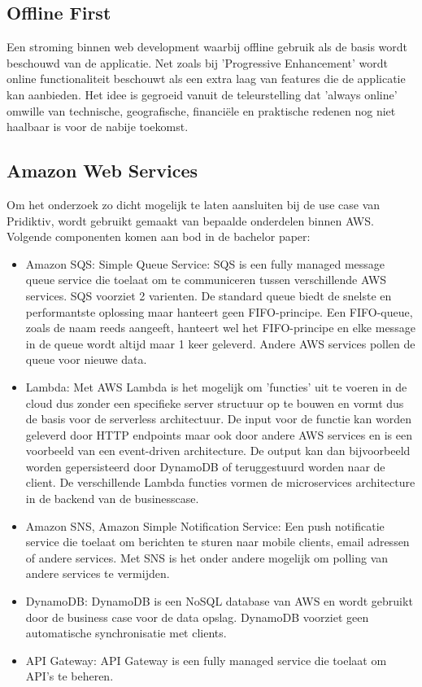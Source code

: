 \subsection{Offline First}
Een stroming \autocite{offline-first} binnen web development waarbij offline gebruik als de basis wordt beschouwd van de applicatie. Net zoals bij 'Progressive Enhancement' wordt online functionaliteit beschouwt als een extra laag van features die de applicatie kan aanbieden. Het idee is gegroeid vanuit de teleurstelling dat 'always online' omwille van technische, geografische, financi\"ele en praktische redenen nog niet haalbaar is voor de nabije toekomst.
\subsection{Amazon Web Services}
Om het onderzoek zo dicht mogelijk te laten aansluiten bij de use case van Pridiktiv, wordt gebruikt gemaakt van bepaalde onderdelen \autocite{aws-documentation} binnen AWS. Volgende componenten  komen aan bod in de bachelor paper:
\begin{itemize}
\item Amazon SQS: Simple Queue Service: SQS is een fully managed message queue service die toelaat om te communiceren tussen verschillende AWS services. SQS voorziet 2 varienten. De standard queue biedt de snelste en performantste oplossing maar hanteert geen FIFO-principe. Een FIFO-queue, zoals de naam reeds aangeeft, hanteert wel het FIFO-principe en elke message in de queue wordt altijd maar 1 keer geleverd. Andere AWS services pollen de queue voor nieuwe data.
\item Lambda: Met AWS Lambda is het mogelijk om 'functies' uit te voeren in de cloud dus zonder een specifieke server structuur op te bouwen en vormt dus de basis voor de serverless architectuur. De input voor de functie kan worden geleverd door HTTP endpoints maar ook door andere AWS services en is een voorbeeld van een event-driven architecture. De output kan dan bijvoorbeeld worden gepersisteerd door DynamoDB of teruggestuurd worden naar de client. De verschillende Lambda functies vormen de microservices architecture in de backend van de businesscase.
\item Amazon SNS, Amazon Simple Notification Service: Een push notificatie service die toelaat om berichten te sturen naar mobile clients, email adressen of andere services. Met SNS is het onder andere mogelijk om polling van andere services te vermijden.
\item DynamoDB: DynamoDB is een NoSQL database van AWS en wordt gebruikt door de business case voor de data opslag. DynamoDB voorziet geen automatische synchronisatie met clients.
\item API Gateway: API Gateway is een fully managed service die toelaat om API's te beheren.
\end{itemize}
